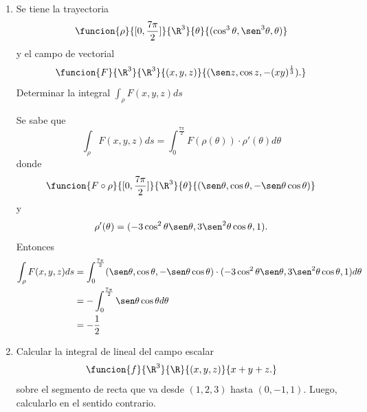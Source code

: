 \documentclass[a4,11pt]{aleph-examen}
\begin{document}
\begin{preguntas}
\begin{respuesta}
\begin{respuesta}
\begin{respuesta}
\begin{enumerate}
\begin{respuesta}
    Notemos que $r$ es derivable  con derivada
    \[
    r'(t) = (-4\sen{4t},4\cos{4t},3),
    \]
    con
    \[
    \|r'(t)\| = \sqrt{16\sen^{2}{4t}+16\cos^{2}{4t}+9} = \sqrt{16+9}=5,
    \]
    para todo $t\in[0,1]$, además, 
    \[
    f(r(t)) = f(\cos{4t},\sen{4t},3t) = \l(\sqrt{\cos^2{4t}+\sen^2{4t}+9t^2}\r)^2 = 1+9t^2.
    \]
    Entonces,
    \begin{align*}
    \int_{r}{f\,ds} &= \int_{0}^{1}{f(r(t))\|r'(t)\|\,dt}\\
    &=5\int_{0}^{1}{1+9t^2\, dt} = 20.
    \end{align*}
    Por lo tanto, $\int_{r}{f\,ds} = 20$.
\end{respuesta}

\item
    Se tiene la trayectoria
    \[
        \funcion{\rho}{[0,\frac{7\pi}{2}]}{\R^3}{\theta}{(\cos^3 \theta, \sen^3 \theta, \theta)}
    \]
    y el campo de vectorial
    \[
        \funcion{F}{\R^3}{\R^3}{(x,y,z)}{(\sen z, \cos z, -(xy)^\frac{1}{3}).}
    \]
    Determinar la integral $\int_{\rho}F(x,y,z)ds$

\begin{respuesta}
    Se sabe que
    \[
    \int_{\rho}F(x,y,z)ds=\int_0^{\frac{7\pi}{2}}F(\rho(\theta))\cdot \rho'(\theta)d\theta
    \]
    donde
    \[
    \funcion{F\circ \rho}{[0,\frac{7\pi}{2}]}{\R^3}{\theta}{(\sen \theta,\cos \theta,-\sen \theta \cos \theta)}
    \]
    y 
    \[
    \rho'(\theta)=(-3\cos^2 \theta \sen \theta,3\sen^2 \theta \cos \theta,1).
    \]
    Entonces 
    \begin{align*}
    \int_{\rho}F(x,y,z)ds&=\int_0^{\frac{7\pi}{2}}(\sen \theta,\cos \theta,-\sen \theta \cos \theta)\cdot (-3\cos^2 \theta \sen \theta,3\sen^2 \theta \cos \theta,1) d\theta\\ 
    &=-\int_0^{\frac{7\pi}{2}}\sen \theta \cos \theta d\theta\\
    &=-\frac{1}{2}
    \end{align*}
\end{respuesta}

\item
    Calcular la integral de lineal del campo escalar  
    \[
        \funcion{f}{\R^3}{\R}{(x,y,z)}{x+y+z.}
    \]
    sobre el segmento de recta que va desde $(1, 2, 3)$ hasta $(0, -1, 1)$. Luego, calcularlo en el sentido contrario.
    

\end{enumerate}
\end{respuesta}
\end{respuesta}
\end{respuesta}
\end{preguntas}
\end{document}
